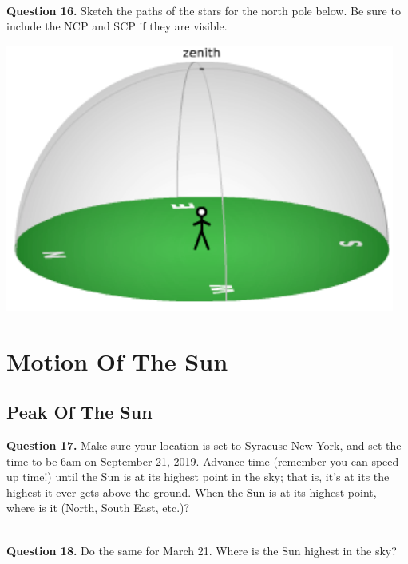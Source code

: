 \documentclass[11pt]{article}
\begin{document}
\hrulefill\\

\textbf{Question 16.} Sketch the paths of the stars for the north pole below. Be sure to include the NCP and SCP if they are visible. \\
\vspace*{1.5cm}

\begin{center}
	\includegraphics{local_sky}
\end{center}

\newpage

\section{Motion Of The Sun}

\subsection{Peak Of The Sun}

\textbf{Question 17.} Make sure your location is set to Syracuse New York, and set the time to be 6am on September 21, 2019. Advance time (remember you can speed up time!) until the Sun is at its highest point in the sky; that is, it's at its the highest it ever gets above the ground. When the Sun is at its highest point, where is it (North, South East, etc.)?\\
\vspace*{1.5cm}

\hrulefill\\

\textbf{Question 18.} Do the same for March 21. Where is the Sun highest in the sky?\\
\vspace*{1.5cm}
\end{document}
